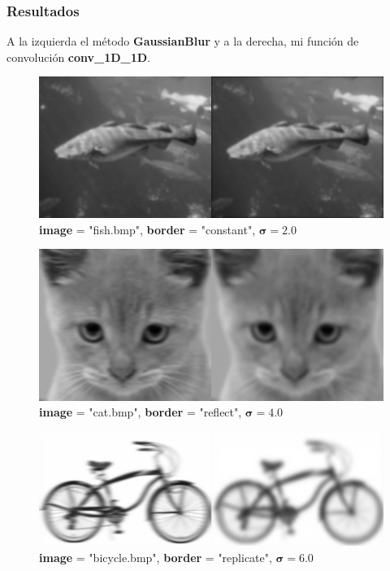 \documentclass{article}
\begin{document}
\newpage

\subsubsection{Resultados}
A la izquierda el método \textbf{GaussianBlur} y a la derecha, mi función de convolución \textbf{conv\_1D\_1D}.
\begin{figure}[hbt!]
	\centering
	\includegraphics[width=.9\textwidth]{assets/ex1-A/constant-s2.jpg}
	\caption{\textbf{image} = "fish.bmp", \textbf{border} = "constant", $\boldsymbol{\sigma} = 2.0$}
\end{figure}
\begin{figure}[hbt!]
	\centering
	\includegraphics[width=.9\textwidth]{assets/ex1-A/reflect-s4.jpg}
	\caption{\textbf{image} = "cat.bmp", \textbf{border} = "reflect", $\boldsymbol{\sigma} = 4.0$}
\end{figure}
\begin{figure}[hbt!]
	\centering
	\includegraphics[width=.9\textwidth]{assets/ex1-A/replicate-s6.jpg}
	\caption{\textbf{image} = "bicycle.bmp", \textbf{border} = "replicate", $\boldsymbol{\sigma} = 6.0$}
\end{figure}
\end{document}
